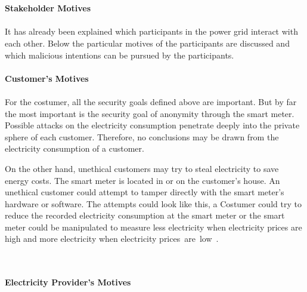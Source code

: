 \\
\\
\textbf{Stakeholder Motives}
\\
\\
It has already been explained which participants in the power grid interact with each other. %
Below the particular motives of the participants are discussed and which malicious intentions can be pursued by the participants.
\\
\\
\textbf{Customer's Motives}
\\
\\
For the costumer, all the security goals defined above are important. But by far the most important is the security goal of anonymity through the smart meter. Possible attacks on the electricity consumption penetrate deeply into the private sphere of each customer. Therefore, no conclusions may be drawn from the electricity consumption of a customer.\\
\begin{samepage}\enlargethispage{\baselineskip} On the other hand, unethical customers may try to steal electricity to save energy costs. The smart meter is located in or on the customer's house. An unethical customer could attempt to tamper directly with the smart meter's hardware or software. The attempts could look like this, a Costumer could try to reduce the recorded electricity consumption at the smart meter or the smart meter could be manipulated to measure less electricity when electricity prices are high and more electricity when electricity \nopagebreak prices~are~low~\cite{lemay2007unified}.\nopagebreak
\end{samepage}
\\
\\
\textbf{Electricity Provider's Motives}
\\
\\
